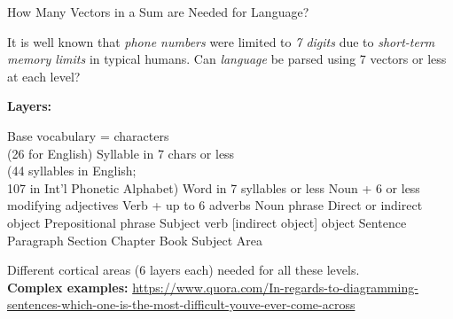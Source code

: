 \begin{slide}[\slideopts,toc={Language}]{How Many Vectors in a Sum are Needed for Language?}

\maybepause
\vspace{-1em}

It is well known that \emph{phone numbers} were limited to \emph{7
digits} due to \emph{short-term memory limits} in typical
humans. \maybepause Can \emph{language} be parsed using 7 vectors
or less at each level?

\maybepause

\textbf{Layers:}
\vspace{-1em}
\begin{multicols}{2}
\begin{enumerate}
 \mpitem Base vocabulary = characters\\
  (26 for English)
  \mpitem Syllable in 7 chars or less\\
  (44 syllables in English;\\
   107 in Int'l Phonetic Alphabet)
  \mpitem Word in 7 syllables or less
  \mpitem Noun + 6 or less modifying adjectives 
  \mpitem Verb + up to 6 adverbs
  \mpitem Noun phrase
  \columnbreak
  \mpitem Direct or indirect object
  \mpitem Prepositional phrase
  \mpitem Subject verb [indirect object] object
  \mpitem Sentence
  \mpitem Paragraph
  \mpitem Section
  \mpitem Chapter
  \mpitem Book
 \mpitem Subject Area %
\end{enumerate}
\end{multicols}
\maybepause
\vspace{-1em}
Different cortical areas (6 layers each) needed for all these levels.\\
\maybepause
\textbf{Complex examples:}
{\tiny
\url{https://www.quora.com/In-regards-to-diagramming-sentences-which-one-is-the-most-difficult-youve-ever-come-across}
}
\end{slide}




